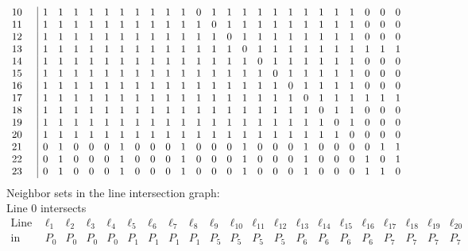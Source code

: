 \documentclass{article}
\begin{document}
{{$$\begin{array}{rr|*{24}r}
10 &  & 1 & 1 & 1 & 1 & 1 & 1 & 1 & 1 & 1 & 1 & 0 & 1 & 1 & 1 & 1 & 1 & 1 & 1 & 1 & 1 & 1 & 0 & 0 & 0\\
11 &  & 1 & 1 & 1 & 1 & 1 & 1 & 1 & 1 & 1 & 1 & 1 & 0 & 1 & 1 & 1 & 1 & 1 & 1 & 1 & 1 & 1 & 0 & 0 & 0\\
12 &  & 1 & 1 & 1 & 1 & 1 & 1 & 1 & 1 & 1 & 1 & 1 & 1 & 0 & 1 & 1 & 1 & 1 & 1 & 1 & 1 & 1 & 0 & 0 & 0\\
13 &  & 1 & 1 & 1 & 1 & 1 & 1 & 1 & 1 & 1 & 1 & 1 & 1 & 1 & 0 & 1 & 1 & 1 & 1 & 1 & 1 & 1 & 1 & 1 & 1\\
14 &  & 1 & 1 & 1 & 1 & 1 & 1 & 1 & 1 & 1 & 1 & 1 & 1 & 1 & 1 & 0 & 1 & 1 & 1 & 1 & 1 & 1 & 0 & 0 & 0\\
15 &  & 1 & 1 & 1 & 1 & 1 & 1 & 1 & 1 & 1 & 1 & 1 & 1 & 1 & 1 & 1 & 0 & 1 & 1 & 1 & 1 & 1 & 0 & 0 & 0\\
16 &  & 1 & 1 & 1 & 1 & 1 & 1 & 1 & 1 & 1 & 1 & 1 & 1 & 1 & 1 & 1 & 1 & 0 & 1 & 1 & 1 & 1 & 0 & 0 & 0\\
17 &  & 1 & 1 & 1 & 1 & 1 & 1 & 1 & 1 & 1 & 1 & 1 & 1 & 1 & 1 & 1 & 1 & 1 & 0 & 1 & 1 & 1 & 1 & 1 & 1\\
18 &  & 1 & 1 & 1 & 1 & 1 & 1 & 1 & 1 & 1 & 1 & 1 & 1 & 1 & 1 & 1 & 1 & 1 & 1 & 0 & 1 & 1 & 0 & 0 & 0\\
19 &  & 1 & 1 & 1 & 1 & 1 & 1 & 1 & 1 & 1 & 1 & 1 & 1 & 1 & 1 & 1 & 1 & 1 & 1 & 1 & 0 & 1 & 0 & 0 & 0\\
20 &  & 1 & 1 & 1 & 1 & 1 & 1 & 1 & 1 & 1 & 1 & 1 & 1 & 1 & 1 & 1 & 1 & 1 & 1 & 1 & 1 & 0 & 0 & 0 & 0\\
21 &  & 0 & 1 & 0 & 0 & 0 & 1 & 0 & 0 & 0 & 1 & 0 & 0 & 0 & 1 & 0 & 0 & 0 & 1 & 0 & 0 & 0 & 0 & 1 & 1\\
22 &  & 0 & 1 & 0 & 0 & 0 & 1 & 0 & 0 & 0 & 1 & 0 & 0 & 0 & 1 & 0 & 0 & 0 & 1 & 0 & 0 & 0 & 1 & 0 & 1\\
23 &  & 0 & 1 & 0 & 0 & 0 & 1 & 0 & 0 & 0 & 1 & 0 & 0 & 0 & 1 & 0 & 0 & 0 & 1 & 0 & 0 & 0 & 1 & 1 & 0\\
\end{array}
$$
}%
Neighbor sets in the line intersection graph:\\
Line 0 intersects 
$$
\begin{array}{|r*{20}{|c}|}
\hline
\mbox{Line}  & \ell_{1} & \ell_{2} & \ell_{3} & \ell_{4} & \ell_{5} & \ell_{6} & \ell_{7} & \ell_{8} & \ell_{9} & \ell_{10} & \ell_{11} & \ell_{12} & \ell_{13} & \ell_{14} & \ell_{15} & \ell_{16} & \ell_{17} & \ell_{18} & \ell_{19} & \ell_{20}\\
\hline
\mbox{in point}  & P_{0} & P_{0} & P_{0} & P_{0} & P_{1} & P_{1} & P_{1} & P_{1} & P_{5} & P_{5} & P_{5} & P_{5} & P_{6} & P_{6} & P_{6} & P_{6} & P_{7} & P_{7} & P_{7} & P_{7}\\

\end{array}$$}
\end{document}
